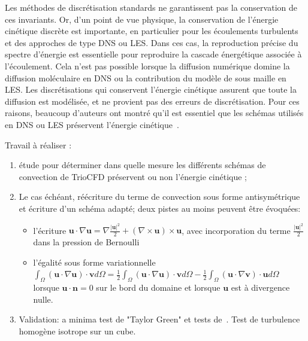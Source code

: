 Les m\'ethodes de discr\'etisation standards ne garantissent pas la conservation de ces invariants. Or, d'un point de vue physique, la conservation de l'\'energie cin\'etique discr\`ete est importante, en particulier pour les \'ecoulements turbulents et des approches de type DNS ou LES. Dans ces cas, la reproduction pr\'ecise du spectre d'\'energie est essentielle pour reproduire la cascade \'energ\'etique associ\'ee \`a l'\'ecoulement. Cela n'est pas possible lorsque la diffusion num\'erique domine la diffusion mol\'eculaire en DNS ou la contribution du mod\`ele de sous maille en LES. Les discr\'etisations qui conservent l'\'energie cin\'etique assurent que toute la diffusion est mod\'elis\'ee, et ne provient pas des erreurs de discr\'etisation. Pour ces  raisons, beaucoup d'auteurs ont montr\'e qu'il est essentiel que les sch\'emas utilis\'es en DNS ou LES pr\'eservent l'\'energie cin\'etique~\cite{Skew-Sym}.

Travail \`a r\'ealiser :

\begin{enumerate}
\item
\'etude pour d\'eterminer dans quelle mesure les diff\'erents sch\'emas de convection de TrioCFD pr\'eservent ou non l'\'energie cin\'etique ;
\item
Le cas \'ech\'eant, r\'e\'ecriture du terme de convection sous forme antisym\'etrique et \'ecriture d'un sch\'ema adapt\'e; deux pistes au moins peuvent \^etre \'evoqu\'ees:
\begin{itemize}
\item l'\'ecriture $\mathbf{u} \cdot \nabla \mathbf{u} = \nabla \frac{|\mathbf{u}|^2}{2} + (\nabla \times \mathbf{u}) \times \mathbf{u}$, avec incorporation du terme $ \frac{|\mathbf{u}|^2}{2}$ dans la pression de Bernoulli
\item l'\'egalit\'e sous forme variationnelle $\int_{\Omega} ( \mathbf{u} \cdot \nabla \mathbf{u} ) \cdot \mathbf{v} d\Omega = \frac{1}{2} \int_{\Omega} ( \mathbf{u} \cdot \nabla \mathbf{u} ) \cdot \mathbf{v} d\Omega - \frac{1}{2} \int_{\Omega} ( \mathbf{u} \cdot \nabla \mathbf{v} ) \cdot \mathbf{u} d\Omega $ lorsque $\mathbf{u} \cdot \mathbf{n} = 0$ sur le bord du domaine et lorsque $\mathbf{u}$ est \`a divergence nulle.
\end{itemize}
\item
Validation: a minima test de "Taylor Green" et tests de~\cite{Skew-Sym}. Test de turbulence homog\`ene isotrope sur un cube.
\end{enumerate}

